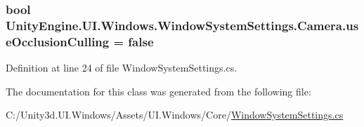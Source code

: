 \subsubsection[{use\+Occlusion\+Culling}]{\setlength{\rightskip}{0pt plus 5cm}bool Unity\+Engine.\+U\+I.\+Windows.\+Window\+System\+Settings.\+Camera.\+use\+Occlusion\+Culling = false}\label{class_unity_engine_1_1_u_i_1_1_windows_1_1_window_system_settings_1_1_camera_a925dac59062b3dcf973bf38638dda998}


Definition at line 24 of file Window\+System\+Settings.\+cs.



The documentation for this class was generated from the following file\+:\begin{DoxyCompactItemize}
\item 
C\+:/\+Unity3d.\+U\+I.\+Windows/\+Assets/\+U\+I.\+Windows/\+Core/\hyperlink{_window_system_settings_8cs}{Window\+System\+Settings.\+cs}\end{DoxyCompactItemize}
